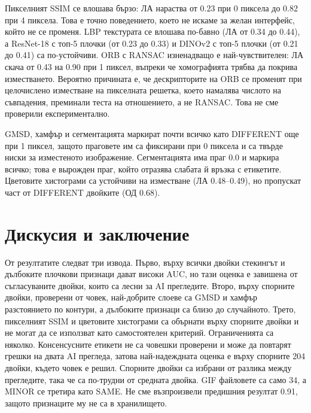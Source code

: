 \documentclass[a4paper,12pt]{article}
\begin{document}
\begin{table}[H]
\centering
\caption{Устойчивост на слоевете към хоризонтално изместване на кандидата. ЛА – дял на SAME двойките, маркирани като DIFFERENT (по-ниско е по-добре); ОД – дял на DIFFERENT двойките, маркирани като DIFFERENT (по-високо е по-добре).}\label{tab:shift}
\scriptsize

\end{table}

Пикселният SSIM се влошава бързо: ЛА нараства от 0.23 при 0 пиксела до 0.82 при 4 пиксела. Това е точно поведението, което не искаме за желан интерфейс, който не се променя. LBP текстурата се влошава по-бавно (ЛА от 0.34 до 0.44), а ResNet-18 с топ-5 плочки (от 0.23 до 0.33) и DINOv2 с топ-5 плочки (от 0.21 до 0.41) са по-устойчиви. ORB с RANSAC изненадващо е най-чувствителен: ЛА скача от 0.43 на 0.90 при 1 пиксел, въпреки че хомографията трябва да покрива изместването. Вероятно причината е, че дескрипторите на ORB се променят при целочислено изместване на пикселната решетка, което намалява числото на съвпадения, преминали теста на отношението, а не RANSAC. Това не сме проверили експериментално.

GMSD, хамфър и сегментацията маркират почти всичко като DIFFERENT още при 1 пиксел, защото праговете им са фиксирани при 0 пиксела и са твърде ниски за изместеното изображение. Сегментацията има праг 0.0 и маркира всичко; това е вырожден праг, който отразява слабата й връзка с етикетите. Цветовите хистограми са устойчиви на изместване (ЛА 0.48–0.49), но пропускат част от DIFFERENT двойките (ОД 0.68).

\section{Дискусия и заключение}\label{sec:discussion}

От резултатите следват три извода. Първо, върху всички двойки стекингът и дълбоките плочкови признаци дават високи AUC, но тази оценка е завишена от съгласуваните двойки, които са лесни за AI прегледите. Второ, върху спорните двойки, проверени от човек, най-добрите слоеве са GMSD и хамфър разстоянието по контури, а дълбоките признаци са близо до случайното. Трето, пикселният SSIM и цветовите хистограми са обърнати върху спорните двойки и не могат да се използват като самостоятелен критерий. Ограниченията са няколко. Консенсусните етикети не са човешки проверени и може да повтарят грешки на двата AI прегледа, затова най-надеждната оценка е върху спорните 204 двойки, където човек е решил. Спорните двойки са избрани от разлика между прегледите, така че са по-трудни от средната двойка. GIF файловете са само 34, а MINOR се третира като SAME. Не сме възпроизвели предишния резултат 0.91, защото признаците му не са в хранилището.
\end{document}
